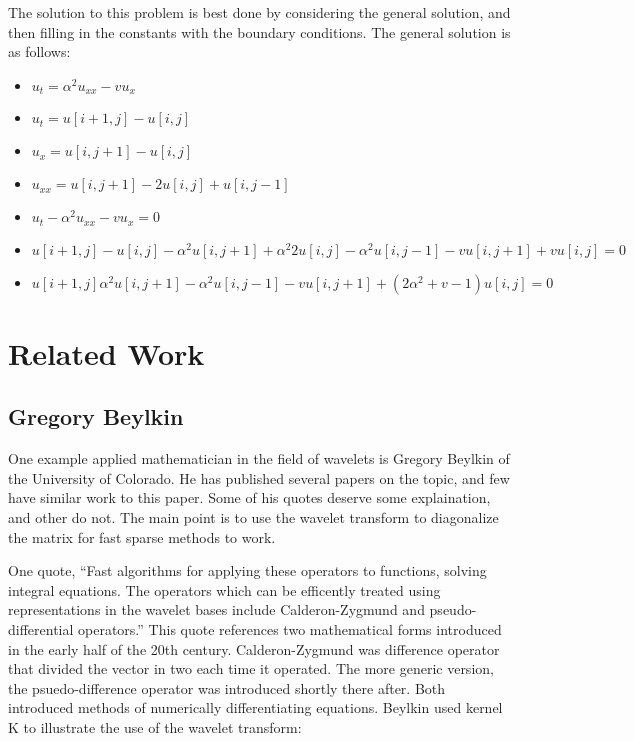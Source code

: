 \documentclass[11pt]{article}
\begin{document}
The solution to this problem is best done by considering the general solution, and then filling in the constants with the boundary conditions.  The general solution is as follows:

\begin{itemize}
\item $u_t = \alpha ^2 u_{xx} - vu_x $
\item $u_t  =  u[i+1,j] - u [i,j]$
\item $u_x = u[i,j+1] - u[i,j] $
\item $u_{xx} = u[i,j+1] - 2u[i,j] + u[i,j-1] $
\item $u_t - \alpha ^2 u_{xx} - vu_x = 0$
\item $ u[i+1,j] - u [i,j] -  \alpha ^2 u[i,j+1] + \alpha ^2 2u[i,j] - \alpha ^2 u[i,j-1] - v u[i,j+1] + v u[i,j] =0$
\item $ u[i+1,j]   \alpha ^2 u[i,j+1]  - \alpha ^2 u[i,j-1] - v u[i,j+1] + (2 \alpha ^2 +v - 1)  u[i,j] =0$ 
\end{itemize}


\section {Related Work}

\subsection {Gregory Beylkin}
One example applied mathematician in the field of wavelets is Gregory Beylkin of the University of Colorado.  He has published several papers on the topic, and few have similar work to this paper.  Some of his quotes deserve some explaination, and other do not.  The main point is to use the wavelet transform to diagonalize the matrix for fast sparse methods to work.  

One quote, ``Fast algorithms for applying these operators to functions, solving integral equations.  The operators which can be efficently treated using representations in the wavelet bases include Calderon-Zygmund and pseudo-differential operators.''\cite{bvpbeylkin}  This quote references two mathematical forms introduced in the early half of the 20th century.  Calderon-Zygmund was difference operator that divided the vector in two each time it operated.  The more generic version, the psuedo-difference operator was introduced shortly there after.  Both introduced methods of numerically differentiating equations.  Beylkin used kernel K to illustrate the use of the wavelet transform: 
\end{document}
